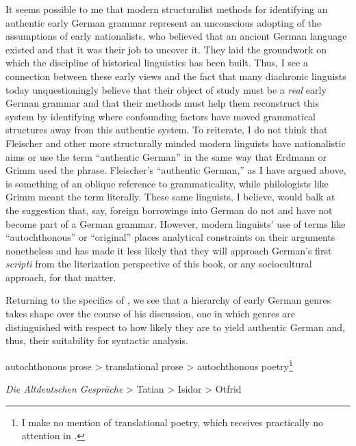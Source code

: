 It seems possible to me that modern structuralist methods for identifying an authentic early German grammar represent an unconscious adopting of the assumptions of early nationalists, who believed that an ancient German language existed and that it was their job to uncover it. They laid the groundwork on which the discipline of historical linguistics has been built. Thus, I see a connection between these early views and the fact that many diachronic linguists today unquestioningly believe that their object of study must be a \textit{real} early German grammar and that their methods must help them reconstruct this system by identifying where confounding factors have moved grammatical structures away from this authentic system. To reiterate, I do not think that Fleischer and other more structurally minded modern linguists have nationalistic aims or use the term “authentic German” in the same way that Erdmann or Grimm used the phrase. Fleischer’s “authentic German,” as I have argued above, is something of an oblique reference to grammaticality, while philologists like Grimm meant the term literally. These same linguists, I believe, would balk at the suggestion that, say, foreign borrowings into German do not and have not become part of a German grammar. However, modern linguists’ use of terms like “autochthonous” or “original” places analytical constraints on their arguments nonetheless and has made it less likely that they will approach German’s first \textit{scripti} from the literization perspective of this book, or any sociocultural approach, for that matter.

Returning to the specifics of \citet{Fleischer2006}, we see that a hierarchy of early German genres takes shape over the course of his discussion, one in which genres are distinguished with respect to how likely they are to yield authentic German and, thus, their suitability for syntactic analysis.

\ea%
    \label{ex:2:9}

          autochthonous prose > translational prose > autochthonous poetry\footnote{{I make no mention of translational poetry, which receives practically no attention in \citet{Fleischer2006}.} }

  \textit{Die Altdeutschen Gespräche} > Tatian > Isidor > Otfrid
    \z


